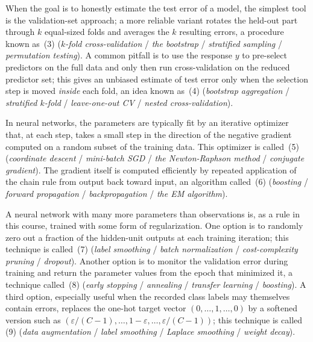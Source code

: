 \documentclass[11pt,a4paper]{article}
\begin{document}
When the goal is to honestly estimate the test error of a model, the simplest tool is the validation-set approach; a more reliable variant rotates the held-out part through $k$ equal-sized folds and averages the $k$ resulting errors, a procedure known as \underline{\hspace{2.5cm}}\,(3) (\emph{$k$-fold cross-validation} / \emph{the bootstrap} / \emph{stratified sampling} / \emph{permutation testing}). A common pitfall is to use the response $y$ to pre-select predictors on the full data and only then run cross-validation on the reduced predictor set; this gives an unbiased estimate of test error only when the selection step is moved \emph{inside} each fold, an idea known as \underline{\hspace{2.5cm}}\,(4) (\emph{bootstrap aggregation} / \emph{stratified $k$-fold} / \emph{leave-one-out CV} / \emph{nested cross-validation}).

In neural networks, the parameters are typically fit by an iterative optimizer that, at each step, takes a small step in the direction of the negative gradient computed on a random subset of the training data. This optimizer is called \underline{\hspace{2.5cm}}\,(5) (\emph{coordinate descent} / \emph{mini-batch SGD} / \emph{the Newton-Raphson method} / \emph{conjugate gradient}). The gradient itself is computed efficiently by repeated application of the chain rule from output back toward input, an algorithm called \underline{\hspace{2.5cm}}\,(6) (\emph{boosting} / \emph{forward propagation} / \emph{backpropagation} / \emph{the EM algorithm}).

A neural network with many more parameters than observations is, as a rule in this course, trained with some form of regularization. One option is to randomly zero out a fraction of the hidden-unit outputs at each training iteration; this technique is called \underline{\hspace{2.5cm}}\,(7) (\emph{label smoothing} / \emph{batch normalization} / \emph{cost-complexity pruning} / \emph{dropout}). Another option is to monitor the validation error during training and return the parameter values from the epoch that minimized it, a technique called \underline{\hspace{2.5cm}}\,(8) (\emph{early stopping} / \emph{annealing} / \emph{transfer learning} / \emph{boosting}). A third option, especially useful when the recorded class labels may themselves contain errors, replaces the one-hot target vector $(0,\dots,1,\dots,0)$ by a softened version such as $(\varepsilon/(C-1),\dots,1-\varepsilon,\dots,\varepsilon/(C-1))$; this technique is called \underline{\hspace{2.5cm}}\,(9) (\emph{data augmentation} / \emph{label smoothing} / \emph{Laplace smoothing} / \emph{weight decay}).
\end{document}
